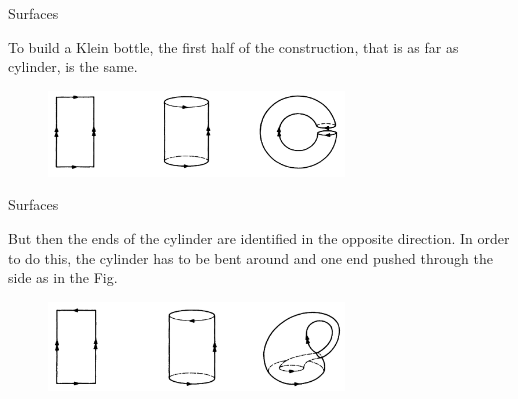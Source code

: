 \documentclass{beamer}
\begin{document}
\begin{frame}{Surfaces}
  \begin{block}{}
    To build a Klein bottle, the first half of the construction, that is as far as cylinder, is the same.
  \end{block}
  \begin{figure}
    \centering
    \includegraphics[width=0.7\textwidth]{figure_1_11.png}
    \caption{}
  \end{figure}
\end{frame}

\begin{frame}{Surfaces}
  \begin{block}{}
    But then the ends of the cylinder are identified in the opposite direction. In order to do this, the cylinder has to be bent around and one end pushed through the side as in the Fig.
  \end{block}
  \begin{figure}
    \centering
    \includegraphics[width=0.7\textwidth]{figure_1_12.png}
    \caption{}
  \end{figure}
\end{frame}
\end{document}
